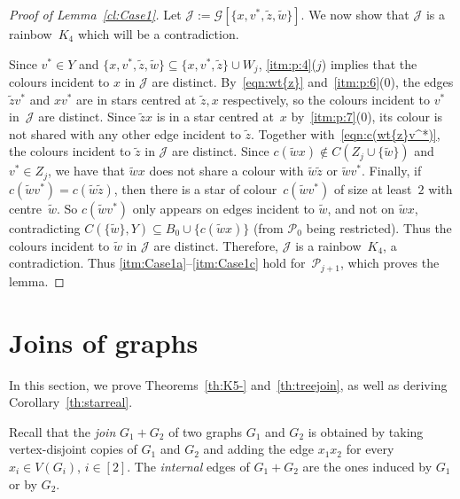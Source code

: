 \documentclass[a4paper, 12pt]{article}
\numberwithin{equation}{section}
\def\wt{\widetilde}
\newcommand{\mc}[1]{\mathcal{#1}}
\newcommand{\ms}[1]{\mathscr{#1}}
\begin{document}
\begin{proof}[Proof of Lemma~\ref{cl:Case1}]
Let $\ms{J} := \ms{G}[\{x,v^*,\wt{z},\wt{w}\}]$. 
We now show that $\ms{J}$ is a rainbow~$K_4$ which will be a contradiction. 

Since $v^* \in Y$ and $\{x,v^*,\wt{z},\wt{w}\} \subseteq \{x,v^*,\wt{z}\} \cup W_j$, \ref{itm:p:4}($j$) implies that the colours incident to $x$ in $\ms{J}$ are distinct.
By~\eqref{eqn:wt{z}} and~\ref{itm:p:6}($0$), 
the edges $\wt{z}v^*$ and $xv^*$ are in stars centred at $\wt{z},x$ respectively, so
the colours incident to $v^*$ in~$\ms{J}$ are distinct.
Since $\wt{z}x$ is in a star centred at~$x$ by~\ref{itm:p:7}($0$), its colour is not shared with any other edge incident to $\wt{z}$.
Together with~\eqref{eqn:c(wt{z}v^*)}, the colours incident to $\wt{z}$ in $\ms{J}$ are distinct.
Since $c(\wt{w}x) \notin C(Z_j \cup \{\wt{w}\})$ and $v^* \in Z_j$, we have that $\wt{w}x$ does not share a colour with $\wt{w}\wt{z}$ or $\wt{w}v^*$.
Finally, if $c(\wt{w}v^*) = c(\wt{w}\wt{z})$, then there is a star of colour~$c(\wt{w}v^*)$ of size at least~$2$ with centre~$\wt{w}$.
So $c(\wt{w}v^*)$ only appears on edges incident to $\wt{w}$, and not on $\wt{w}x$, contradicting $C(\{\wt{w}\},Y) \subseteq B_{0} \cup \{c(\wt{w}x)\}$ (from $\mc{P}_0$ being restricted).
Thus the colours incident to $\wt{w}$ in $\ms{J}$ are distinct.
Therefore, $\ms{J}$ is a rainbow~$K_4$, a contradiction.
Thus \ref{itm:Case1a}--\ref{itm:Case1c} hold for~$\mc{P}_{j+1}$, which proves the lemma.
\end{proof}














\section{Joins of graphs}
\label{sec:rest}

In this section, we prove Theorems~\ref{th:K5-} and~\ref{th:treejoin}, as well as deriving Corollary~\ref{th:starreal}.

Recall that the \emph{join} $G_1+G_2$ of two graphs $G_1$ and $G_2$ is obtained by taking vertex-disjoint copies of $G_1$ and $G_2$ and adding the edge $x_1x_2$ for every $x_i \in V(G_i)$, $i \in [2]$.
The \emph{internal} edges of $G_1 + G_2$ are the ones induced by $G_1$ or by $G_2$.
\end{document}

